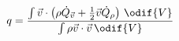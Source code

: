 \begin{equation}\label{eq:vdhit_lundgren_forcing}
  q = \frac
    {\int \vec{v} \cdot \left(
      \rho \dot{Q}_{\vec{v}} + \tfrac12\vec{v}\dot{Q}_\rho
    \right) \, \odif{V}}
    {\int \rho \vec{v} \cdot \vec{v} \, \odif{V}}
\end{equation}
